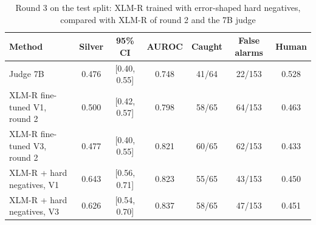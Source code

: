 \documentclass[conference]{IEEEtran}
\begin{document}
\begin{table}[t]
\caption{Round 3 on the test split: XLM-R trained with error-shaped hard negatives, compared with XLM-R of round 2 and the 7B judge}
\label{tab:round3}
\centering
\footnotesize
\begin{tabular}{lcccccc}
\toprule
Method & Silver & 95\% CI & AUROC & Caught & False alarms & Human \\
\midrule
Judge 7B & 0.476 & [0.40, 0.55] & 0.748 & 41/64 & 22/153 & 0.528 \\
XLM-R fine-tuned V1, round 2 & 0.500 & [0.42, 0.57] & 0.798 & 58/65 & 64/153 & 0.463 \\
XLM-R fine-tuned V3, round 2 & 0.477 & [0.40, 0.55] & 0.821 & 60/65 & 62/153 & 0.433 \\
XLM-R + hard negatives, V1 & 0.643 & [0.56, 0.71] & 0.823 & 55/65 & 43/153 & 0.450 \\
XLM-R + hard negatives, V3 & 0.626 & [0.54, 0.70] & 0.837 & 58/65 & 47/153 & 0.451 \\
\bottomrule
\end{tabular}
\end{table}
\end{document}
